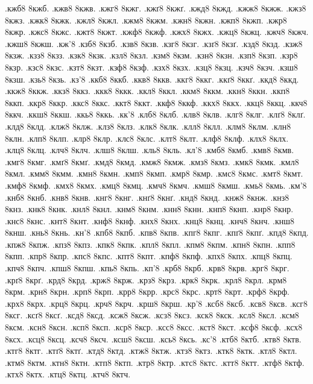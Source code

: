 {.кжб8
8кжб.
.кжв8
8кжв.
.кжг8
8кжг.
.кжґ8
8кжґ.
.кжд8
8кжд.
.кжж8
8кжж.
.кжз8
8кжз.
.кжк8
8кжк.
.кжл8
8кжл.
.кжм8
8кжм.
.кжн8
8кжн.
.кжп8
8кжп.
.кжр8
8кжр.
.кжс8
8кжс.
.кжт8
8кжт.
.кжф8
8кжф.
.кжх8
8кжх.
.кжц8
8кжц.
.кжч8
8кжч.
.кжш8
8кжш.
.кж'8
.кзб8
8кзб.
.кзв8
8кзв.
.кзг8
8кзг.
.кзґ8
8кзґ.
.кзд8
8кзд.
.кзж8
8кзж.
.кзз8
8кзз.
.кзк8
8кзк.
.кзл8
8кзл.
.кзм8
8кзм.
.кзн8
8кзн.
.кзп8
8кзп.
.кзр8
8кзр.
.кзс8
8кзс.
.кзт8
8кзт.
.кзф8
8кзф.
.кзх8
8кзх.
.кзц8
8кзц.
.кзч8
8кзч.
.кзш8
8кзш.
.кзь8
8кзь.
.кз'8
.ккб8
8ккб.
.ккв8
8ккв.
.ккг8
8ккг.
.ккґ8
8ккґ.
.ккд8
8ккд.
.ккж8
8ккж.
.ккз8
8ккз.
.ккк8
8ккк.
.ккл8
8ккл.
.ккм8
8ккм.
.ккн8
8ккн.
.ккп8
8ккп.
.ккр8
8ккр.
.ккс8
8ккс.
.ккт8
8ккт.
.ккф8
8ккф.
.ккх8
8ккх.
.ккц8
8ккц.
.ккч8
8ккч.
.ккш8
8ккш.
.ккь8
8ккь.
.кк'8
.клб8
8клб.
.клв8
8клв.
.клг8
8клг.
.клґ8
8клґ.
.клд8
8клд.
.клж8
8клж.
.клз8
8клз.
.клк8
8клк.
.клл8
8клл.
.клм8
8клм.
.клн8
8клн.
.клп8
8клп.
.клр8
8клр.
.клс8
8клс.
.клт8
8клт.
.клф8
8клф.
.клх8
8клх.
.клц8
8клц.
.клч8
8клч.
.клш8
8клш.
.кль8
8кль.
.кл'8
.кмб8
8кмб.
.кмв8
8кмв.
.кмг8
8кмг.
.кмґ8
8кмґ.
.кмд8
8кмд.
.кмж8
8кмж.
.кмз8
8кмз.
.кмк8
8кмк.
.кмл8
8кмл.
.кмм8
8кмм.
.кмн8
8кмн.
.кмп8
8кмп.
.кмр8
8кмр.
.кмс8
8кмс.
.кмт8
8кмт.
.кмф8
8кмф.
.кмх8
8кмх.
.кмц8
8кмц.
.кмч8
8кмч.
.кмш8
8кмш.
.кмь8
8кмь.
.км'8
.кнб8
8кнб.
.кнв8
8кнв.
.кнг8
8кнг.
.кнґ8
8кнґ.
.кнд8
8кнд.
.кнж8
8кнж.
.кнз8
8кнз.
.кнк8
8кнк.
.кнл8
8кнл.
.кнм8
8кнм.
.кнн8
8кнн.
.кнп8
8кнп.
.кнр8
8кнр.
.кнс8
8кнс.
.кнт8
8кнт.
.кнф8
8кнф.
.кнх8
8кнх.
.кнц8
8кнц.
.кнч8
8кнч.
.кнш8
8кнш.
.кнь8
8кнь.
.кн'8
.кпб8
8кпб.
.кпв8
8кпв.
.кпг8
8кпг.
.кпґ8
8кпґ.
.кпд8
8кпд.
.кпж8
8кпж.
.кпз8
8кпз.
.кпк8
8кпк.
.кпл8
8кпл.
.кпм8
8кпм.
.кпн8
8кпн.
.кпп8
8кпп.
.кпр8
8кпр.
.кпс8
8кпс.
.кпт8
8кпт.
.кпф8
8кпф.
.кпх8
8кпх.
.кпц8
8кпц.
.кпч8
8кпч.
.кпш8
8кпш.
.кпь8
8кпь.
.кп'8
.крб8
8крб.
.крв8
8крв.
.крг8
8крг.
.крґ8
8крґ.
.крд8
8крд.
.крж8
8крж.
.крз8
8крз.
.крк8
8крк.
.крл8
8крл.
.крм8
8крм.
.крн8
8крн.
.крп8
8крп.
.крр8
8крр.
.крс8
8крс.
.крт8
8крт.
.крф8
8крф.
.крх8
8крх.
.крц8
8крц.
.крч8
8крч.
.крш8
8крш.
.кр'8
.ксб8
8ксб.
.ксв8
8ксв.
.ксг8
8ксг.
.ксґ8
8ксґ.
.ксд8
8ксд.
.ксж8
8ксж.
.ксз8
8ксз.
.кск8
8кск.
.ксл8
8ксл.
.ксм8
8ксм.
.ксн8
8ксн.
.ксп8
8ксп.
.кср8
8кср.
.ксс8
8ксс.
.кст8
8кст.
.ксф8
8ксф.
.ксх8
8ксх.
.ксц8
8ксц.
.ксч8
8ксч.
.ксш8
8ксш.
.ксь8
8ксь.
.кс'8
.ктб8
8ктб.
.ктв8
8ктв.
.ктг8
8ктг.
.ктґ8
8ктґ.
.ктд8
8ктд.
.ктж8
8ктж.
.ктз8
8ктз.
.ктк8
8ктк.
.ктл8
8ктл.
.ктм8
8ктм.
.ктн8
8ктн.
.ктп8
8ктп.
.ктр8
8ктр.
.ктс8
8ктс.
.ктт8
8ктт.
.ктф8
8ктф.
.ктх8
8ктх.
.ктц8
8ктц.
.ктч8
8ктч.
}
